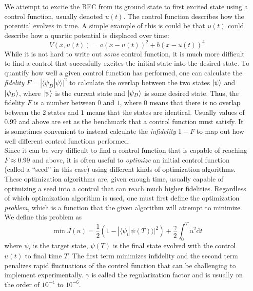 \documentclass[a4paper, twocolumn]{revtex4-1}
\begin{document}
We attempt to excite the BEC from its ground state to first excited state using a control function, usually denoted $u(t)$. The control function describes how the potential evolves in time. A simple example of this is could be that $u(t)$ could describe how a quartic potential is displaced over time:
\begin{equation}
	V(x, u(t)) = a(x-u(t))^2 + b(x-u(t))^4
	\label{eq:quartic-potential}
\end{equation}
While it is not hard to write out \textit{some} control function, it is much more difficult to find a control that succesfully excites the initial state into the desired state. To quantify how well a given control function has performed, one can calculate the \textit{fidelity} $F = | \langle \psi_D | \psi \rangle |^2$ to calculate the overlap between the two states $\ket{\psi}$ and $\ket{\psi_D}$, where $\ket{\psi}$ is the current state and $\ket{\psi_D}$ is some desired state. Thus, the fidelity $F$ is a number between $0$ and $1$, where $0$ means that there is no overlap between the 2 states and $1$ means that the states are identical. Usually values of $0.99$ and above are set as the benchmark that a control function must satisfy. It is sometimes convenient to instead calculate the \textit{infidelity} $1-F$ to map out how well different control functions performed.\\

Since it can be very difficult to find a control function that is capable of reaching $F\approx 0.99$ and above, it is often useful to \textit{optimize} an initial control function (called a ``seed'' in this case) using different kinds of optimization algorithms. These optimization algorithms are, given enough time, usually capable of optimizing a seed into a control that can reach much higher fidelities. Regardless of which optimization algorithm is used, one must first define the optimization \textit{problem}, which is a function that the given algorithm will attempt to minimize. We define this problem as \cite{JensJacobPhDThesis} 
\begin{equation}
	\min J(u) = \frac{1}{2}(1-| \langle \psi_{t} | \psi(T) \rangle|^2) + \frac{\gamma}{2} \int_{0}^{T} \dot{u}^2 \text{d}t
\end{equation}
where $\psi_{t}$ is the target state, $\psi(T)$ is the final state evolved with the control $u(t)$ to final time $T$. The first term minimizes infidelity and the second term penalizes rapid fluctuations of the control function that can be challenging to implement experimentally. $\gamma$ is called the regularization factor and is usually on the order of $10^{-4}$ to $10^{-6}$. \\
\end{document}
